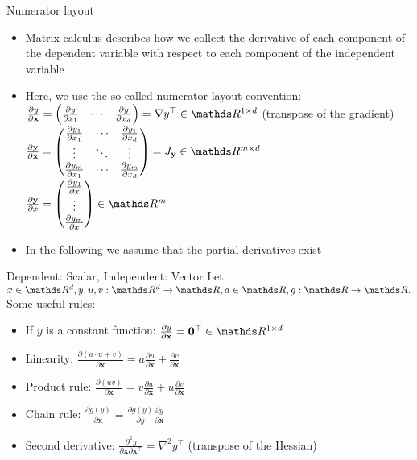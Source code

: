 \documentclass[11pt,compress,t,notes=noshow, xcolor=table]{beamer}
\begin{document}
\begin{vbframe}{Numerator layout}
\begin{itemize}
 
    \item Matrix calculus describes how we collect the derivative of each component of the dependent variable with respect to each component of the independent variable
    \item Here, we use the so-called numerator layout convention:
    $\frac{\partial y}{\partial \mathbf{x}} = \begin{pmatrix}\frac{\partial y}{\partial x_1} & \cdots & \frac{\partial y}{\partial x_d}\end{pmatrix} = \nabla y^\top \in \R^{1\times d}$ (transpose of the gradient)\\
    $\frac{\partial \mathbf{y}}{\partial \mathbf{x}} = \begin{pmatrix}\frac{\partial y_1}{\partial x_1} & \cdots & \frac{\partial y_1}{\partial x_d} \\
    \vdots & \ddots & \vdots \\ 
    \frac{\partial y_m}{\partial x_1} & \cdots & \frac{\partial y_m}{\partial x_d}
    \end{pmatrix} = J_\mathbf{y} \in \R^{m \times d}$ \\
    $\frac{\partial \mathbf{y}}{\partial x} = \begin{pmatrix}\frac{\partial y_1}{\partial x} \\
    \vdots\\ 
    \frac{\partial y_m}{\partial x}
    \end{pmatrix} \in \R^{m}$ 
    \item In the following we assume that the partial derivatives exist
\end{itemize}
\end{vbframe}

\begin{vbframe}{Dependent: Scalar, Independent: Vector}
Let $x \in \R^d, y,u,v: \R^d \rightarrow \R, a \in \R, g:\R\rightarrow\R.$ \\
\medskip
Some useful rules:
\begin{itemize}
    \item If $y$ is a constant function: $\frac{\partial y}{\partial \mathbf{x}} = \mathbf{0}^\top \in \R^{1\times d}$
    \item Linearity: $\frac{\partial (a\cdot u + v)}{\partial \mathbf{x}} = a\frac{\partial u}{\partial \mathbf{x}} + \frac{\partial v}{\partial \mathbf{x}}$
    \item Product rule: $\frac{\partial (u  v)}{\partial \mathbf{x}} = v\frac{\partial u}{\partial \mathbf{x}} + u\frac{\partial v}{\partial \mathbf{x}}$
    \item Chain rule: $\frac{\partial g(y)}{\partial \mathbf{x}} = \frac{\partial g(y)}{\partial y}\frac{\partial y}{\partial \mathbf{x}} $
    \item Second derivative: $\frac{\partial^2 y}{\partial \mathbf{x}\partial\mathbf{x}^\top} = \nabla^2 y^\top$ (transpose of the Hessian)
\end{itemize}
\end{vbframe}
\end{document}

